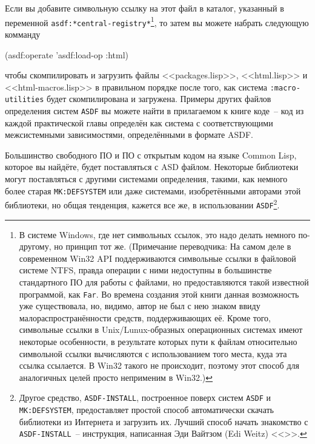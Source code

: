Если вы добавите символьную ссылку на этот файл в каталог, указанный в переменной
\lstinline{asdf:*central-registry*}\footnote{В системе Windows, где нет символьных ссылок, это
  надо делать немного по-другому, но принцип тот же. (Примечание переводчика: На самом
  деле в современном Win32 API поддерживаются символьные ссылки в файловой системе NTFS,
  правда операции с ними недоступны в большинстве стандартного ПО для работы с файлами, но
  предоставляются такой известной программой, как \lstinline{Far}. Во времена создания этой
  книги данная возможность уже существовала, но, видимо, автор не был с нею знаком ввиду
  малораспространённости средств, поддерживающих её. Кроме того, символьные ссылки в
  Unix/Lunux-образных операционных системах имеют некоторые особенности, в результате
  которых пути к файлам относительно символьной ссылки вычисляются с использованием того
  места, куда эта ссылка ссылается. В Win32 такого не происходит, поэтому этот способ для
  аналогичных целей просто неприменим в Win32.) }, то затем вы можете набрать следующую
комманду

\begin{myverb}
(asdf:operate 'asdf:load-op :html)
\end{myverb}

чтобы скомпилировать и загрузить файлы <<packages.lisp>>, <<html.lisp>> и
<<html-macros.lisp>> в правильном порядке после того, как система \lstinline{:macro-utilities}
будет скомпилирована и загружена. Примеры других файлов определения систем \lstinline{ASDF} вы
можете найти в прилагаемом к книге коде~-- код из каждой практической главы определён как
система с соответствующими межсистемными зависимостями, определёнными в формате ASDF.

Большинство свободного ПО и ПО с открытым кодом на языке Common Lisp, которое вы найдёте,
будет поставляться с ASD файлом. Некоторые библиотеки могут поставляться с другими
системами определения, такими, как немного более старая \lstinline{MK:DEFSYSTEM} или даже
системами, изобретёнными авторами этой библиотеки, но общая тенденция, кажется все же, в
использовании \lstinline{ASDF}\footnote{Другое средство, \lstinline{ASDF-INSTALL}, построенное
  поверх систем \lstinline{ASDF} и \lstinline{MK:DEFSYSTEM}, предоставляет простой способ
  автоматически скачать библиотеки из Интернета и загрузить их. Лучший способ начать
  знакомство с \lstinline{ASDF-INSTALL}~-- инструкция, написанная Эди Вайтзом (Edi Weitz)
  <<>>. }.


